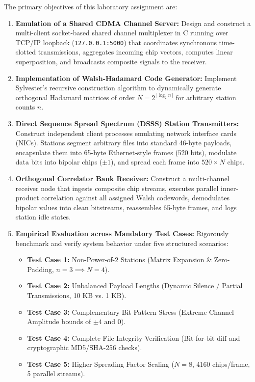 \documentclass[11pt,a4paper]{article}
\begin{document}
The primary objectives of this laboratory assignment are:
\begin{enumerate}
    \item \textbf{Emulation of a Shared CDMA Channel Server:} Design and construct a multi-client socket-based shared channel multiplexer in C running over TCP/IP loopback (\texttt{127.0.0.1:5000}) that coordinates synchronous time-slotted transmissions, aggregates incoming chip vectors, computes linear superposition, and broadcasts composite signals to the receiver.
    \item \textbf{Implementation of Walsh-Hadamard Code Generator:} Implement Sylvester's recursive construction algorithm to dynamically generate orthogonal Hadamard matrices of order $N = 2^{\lceil \log_2 n \rceil}$ for arbitrary station counts $n$.
    \item \textbf{Direct Sequence Spread Spectrum (DSSS) Station Transmitters:} Construct independent client processes emulating network interface cards (NICs). Stations segment arbitrary files into standard 46-byte payloads, encapsulate them into 65-byte Ethernet-style frames (520 bits), modulate data bits into bipolar chips ($\pm 1$), and spread each frame into $520 \times N$ chips.
    \item \textbf{Orthogonal Correlator Bank Receiver:} Construct a multi-channel receiver node that ingests composite chip streams, executes parallel inner-product correlation against all assigned Walsh codewords, demodulates bipolar values into clean bitstreams, reassembles 65-byte frames, and logs station idle states.
    \item \textbf{Empirical Evaluation across Mandatory Test Cases:} Rigorously benchmark and verify system behavior under five structured scenarios:
    \begin{itemize}
        \item \textbf{Test Case 1:} Non-Power-of-2 Stations (Matrix Expansion \& Zero-Padding, $n = 3 \implies N = 4$).
        \item \textbf{Test Case 2:} Unbalanced Payload Lengths (Dynamic Silence / Partial Transmissions, 10 KB vs. 1 KB).
        \item \textbf{Test Case 3:} Complementary Bit Pattern Stress (Extreme Channel Amplitude bounds of $\pm 4$ and $0$).
        \item \textbf{Test Case 4:} Complete File Integrity Verification (Bit-for-bit diff and cryptographic MD5/SHA-256 checks).
        \item \textbf{Test Case 5:} Higher Spreading Factor Scaling ($N = 8$, 4160 chips/frame, 5 parallel streams).
    \end{itemize}
\end{enumerate}
\end{document}
